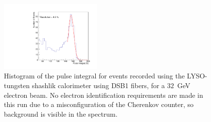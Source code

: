 \documentclass[12pt]{article}
\begin{document}
\begin{figure}[H] \centering
\includegraphics[width=0.45\textwidth]{figs/TOF_ShashlikDSB1Fiber_Electron_32GeV_energy} 
\caption{ Histogram of the pulse integral for events recorded using
the LYSO-tungsten shashlik calorimeter using DSB1 fibers, for 
a $32$~GeV electron beam. No electron identification requirements
are made in this run due to a misconfiguration of the Cherenkov counter,
so background is visible in the spectrum. } 
\label{fig:ShashlikFiberEnergy32GeV}
\end{figure}
\end{document}
